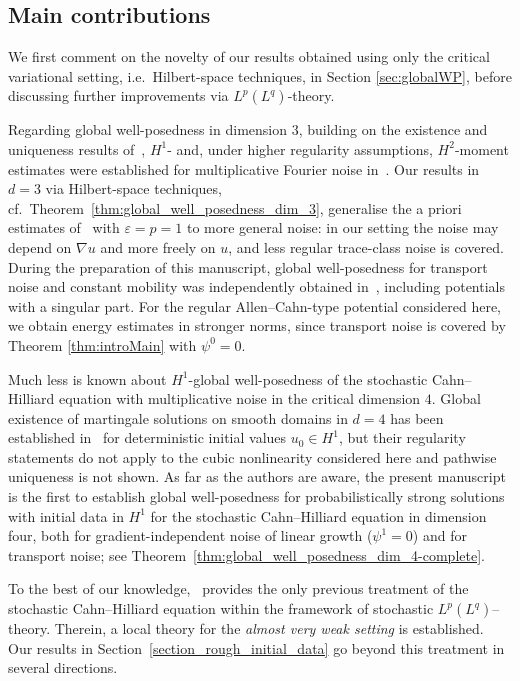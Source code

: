 \documentclass[reqno]{amsart}
\newcommand{\1}{\mathbf{1}}
\newcommand{\grad}{\nabla}
\begin{document}
\subsection{Main contributions}
\label{subsec:contributions}

We first comment on the novelty of our results obtained using only the critical variational setting, i.e.\ Hilbert-space techniques, in Section \ref{sec:globalWP}, before discussing further improvements via $L^p(L^q)$-theory. 

Regarding global well-posedness in dimension $3$, building on the existence and uniqueness results of~\cite{Scarpa2018}, $H^1$- and, under higher regularity assumptions, $H^2$-moment estimates were established for multiplicative Fourier noise in~\cite{Antonopoulou23}. Our results in $d=3$ via Hilbert-space techniques, cf.\ Theorem~\ref{thm:global_well_posedness_dim_3}, generalise the a priori estimates of~\cite[Thm.~2.2]{Antonopoulou23} with $\varepsilon=p=1$ to more general noise: in our setting the noise may depend on $\grad u$ and more freely on $u$, and less regular trace-class noise is covered. During the preparation of this manuscript, global well-posedness for transport noise and constant mobility was independently obtained in~\cite{diPrimioPapiniScarpa26}, including potentials with a singular part. For the regular Allen--Cahn-type potential considered here, we obtain energy estimates in stronger norms, since transport noise is covered by Theorem \ref{thm:introMain} with $\psi^0=0$.
    
Much less is known about $H^1$-global well-posedness of the stochastic Cahn--Hilliard equation with multiplicative noise in the critical dimension $4$. Global existence of martingale solutions on smooth domains in $d=4$ has been established in~\cite[Thm.~2.2]{Scarpa2021b} for deterministic initial values $u_0\in H^1$, but their regularity statements do not apply to the cubic nonlinearity considered here and pathwise uniqueness is not shown. As far as the authors are aware, the present manuscript is the first to establish global well-posedness for probabilistically strong solutions with initial data in $H^1$ for the stochastic Cahn--Hilliard equation in dimension four, both for gradient-independent noise of linear growth ($\psi^1=0$) and for transport noise; see Theorem~\ref{thm:global_well_posedness_dim_4-complete}. 

To the best of our knowledge,~\cite[Section 7.3]{agrestiNonlinearParabolicStochastic2022}
provides the only previous treatment of the stochastic Cahn--Hilliard equation within the framework of stochastic $L^p(L^q)$--theory. Therein, a local theory for the \emph{almost very weak setting} is established. Our results in Section~\ref{section_rough_initial_data} go beyond this treatment in several directions. 
\end{document}
